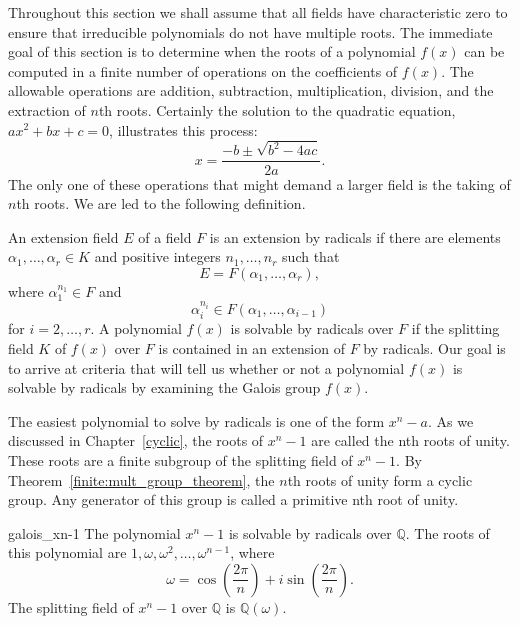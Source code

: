  
Throughout this section we shall assume that all fields have
characteristic zero to ensure that irreducible polynomials do not have
multiple roots. The immediate goal of this section is to determine when
the roots of a polynomial $f(x)$ can be computed in a finite number of
operations on the coefficients of $f(x)$. The allowable operations are
addition, subtraction, multiplication, division, and the extraction
of $n$th roots. Certainly the solution to the quadratic equation,
$a x^2 + b x +c=0$, illustrates this process:
\[
x = \frac{-b \pm \sqrt{b^2 - 4ac}}{2a}.
\]
The only one of these operations that might demand a larger field is
the taking of $n$th roots.  We are led to the following definition.
 
 
An extension field $E$ of a field $F$ is an 
{\bfi extension by radicals\/} if there are
elements $\alpha_1, \ldots, \alpha_r \in K$ and positive integers
$n_1, \ldots, n_r$ such that  
\[
E=F(\alpha_1, \ldots, \alpha_r ),
\]
where $\alpha_1^{n_1} \in F$ and
\[
\alpha_i^{n_i} \in F( \alpha_1, \ldots, \alpha_{i-1} )
\]
for $i = 2, \dots, r$. A polynomial $f(x)$ is {\bfi solvable by
radicals\/} over $F$ if the splitting
field $K$ of $f(x)$ over $F$ is contained in an extension of $F$ by
radicals. Our goal is to arrive at  
criteria that will tell us whether or not a polynomial $f(x)$ is
solvable by radicals by examining the Galois group $f(x)$.
 
 
The easiest polynomial to solve by radicals is one of the form $x^n -
a$. As we discussed in Chapter~\ref{cyclic}, the roots of $x^n - 1$ are called
the {\bfi nth roots of unity}.  These
roots are a finite subgroup of the splitting field of $x^n -1$. By
Theorem~\ref{finite:mult_group_theorem}, the $n$th roots of unity form a cyclic group.  Any
generator of this group is called a {\bfi primitive nth root of
unity}. 
 
 

\begin{example}{galois_xn-1}
The polynomial $x^n - 1$ is solvable by radicals over ${\mathbb Q}$. The
roots of this polynomial are $1, \omega, \omega^2, \ldots,
\omega^{n-1}$, where
\[
\omega = \cos\left( \frac{2 \pi}{n} \right) + 
i \sin\left( \frac{2 \pi}{n} \right).
\] 
The splitting field of $x^n - 1$ over ${\mathbb Q}$ is ${\mathbb Q}(\omega)$.
\end{example}
 
 

